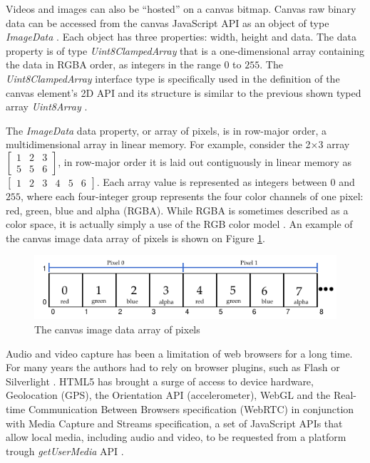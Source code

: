 Videos and images can also be ``hosted'' on a canvas bitmap. Canvas raw binary data can be accessed from the canvas JavaScript API as an object of type \textit{ImageData} \cite{Canvas2013}. Each object has three properties: width, height and data. The data property is of type \textit{Uint8ClampedArray} that is a one-dimensional array containing the data in RGBA order, as integers in the range $0$ to $255$. The \textit{Uint8ClampedArray} interface type is specifically used in the definition of the canvas element's 2D API and its structure is  similar to the previous shown typed array \textit{Uint8Array} \cite{Canvas2013} \cite{TypedArray2013}.

The \textit{ImageData} data property, or array of pixels, is in row-major order, a multidimensional array in linear memory. For example, consider the 2×3 array $\begin{bmatrix}
1 & 2 & 3\\
5 & 5 & 6
\end{bmatrix}$, in row-major order it is laid out contiguously in linear memory as $\begin{bmatrix}
1 & 2 & 3 & 4 & 5 & 6
\end{bmatrix}$. Each array value is represented as integers between $0$ and $255$, where each four-integer group represents the four color channels of one pixel: red, green, blue and alpha (RGBA). While RGBA is sometimes described as a color space, it is actually simply a use of the RGB color model \cite{Gonzalez2007}. An example of the canvas image data array of pixels is shown on Figure \ref{figure:imagedata_array}.

\begin{figure}[!htb]
  \centering
  \includegraphics[width=\linewidth]{chapters/basic_concepts/imagedata_array.pdf}
  \caption{The canvas image data array of pixels}
  \label{figure:imagedata_array}
\end{figure}

Audio and video capture has been a limitation of web browsers for a long time. For many years the authors had to rely on browser plugins, such as Flash \cite{Flash2013} or Silverlight \cite{Silverlight2013} \cite{Rocks2013}. HTML5 \cite{Hickson2013} has brought a surge of access to device hardware, Geolocation (GPS), the Orientation API (accelerometer), WebGL \cite{WebGL2013} and the Real-time Communication Between Browsers specification (WebRTC) \cite{WebRTC2013} in conjunction with Media Capture and Streams specification, a set of JavaScript APIs that allow local media, including audio and video, to be requested from a platform trough \textit{getUserMedia} API \cite{WC2006}.

